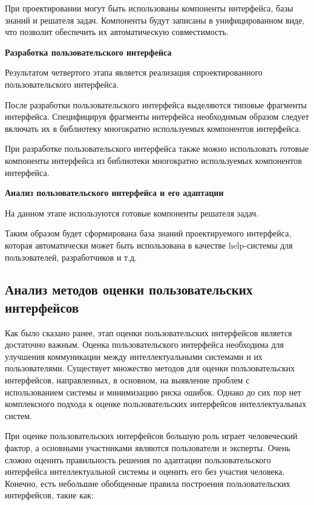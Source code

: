 При проектировании могут быть использованы компоненты интерфейса, базы знаний и решателя задач. 
Компоненты будут записаны в унифицированном виде, что позволит обеспечить их автоматическую совместимость.

\textbf{Разработка пользовательского интерфейса}

Результатом четвертого этапа является реализация спроектированного пользовательского интерфейса. 

После разработки пользовательского интерфейса выделяются типовые
фрагменты интерфейса. Специфицируя фрагменты интерфейса необходимым образом следует включать их в библиотеку многократно используемых компонентов интерфейса.

При разработке пользовательского интерфейса также можно использовать готовые компоненты интерфейса из библиотеки многократно используемых компонентов интерфейса.



\textbf{Анализ пользовательского интерфейса и его адаптации}

На данном этапе используются готовые компоненты решателя задач.

Таким образом будет сформирована база знаний проектируемого интерфейса, которая автоматически может быть использована в качестве help-системы для пользователей, разработчиков и т.д.

\subsection{Анализ методов оценки пользовательских интерфейсов}
\label{sec_UI_analisys}

Как было сказано ранее, этап оценки пользовательских интерфейсов является достаточно важным.
Оценка пользовательского интерфейса необходима для улучшения коммуникации между интеллектуальными системами и их пользователями. Существует множество методов для оценки пользовательских интерфейсов, направленных, в основном, на выявление проблем с использованием системы и минимизацию риска ошибок. Однако до сих пор нет комплексного подхода к оценке пользовательских интерфейсов интеллектуальных систем.

При оценке пользовательских интерфейсов большую роль играет человеческий фактор, а основными участниками являются пользователи и эксперты. Очень сложно оценить правильность решения по адаптации пользовательского интерфейса интеллектуальной системы и оценить его без участия человека. Конечно, есть небольшие обобщенные правила построения пользовательских интерфейсов, такие как:

